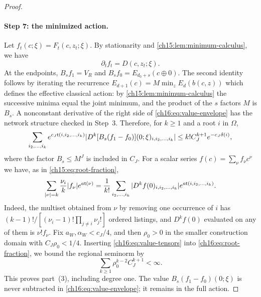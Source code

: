 \begin{proof}
\paragraph{Step 7: the minimized action.}
Let $f_t(c;\xi)=F_t(c,z_t;\xi)$. By stationarity and \cref{ch15:lem:minimum-calculus}, we have
\begin{equation}\label{ch16:eq:value-envelope}
 \partial_tf_t=D(c,z_t;\xi).
\end{equation}
At the endpoints, $B_sf_1=V_R$ and $B_sf_0=E_{d_0+s}(c\oplus0)$. The second identity follows by iterating the recurrence $E_{d+1}(c)=M\min_zE_d(b(c,z))$ which defines the effective classical action: by \cref{ch15:lem:minimum-calculus} the successive minima equal the joint minimum, and the product of the $s$ factors $M$ is $B_s$. A nonconstant derivative of the right side of \eqref{ch16:eq:value-envelope} has the network structure checked in Step~3. Therefore, for $k\ge1$ and a root $i$ in $\Omega$,
\begin{equation}\label{ch16:eq:value-tensors}
 \sum_{i_2,\ldots,i_k}
 e^{c_J\mathsf t(i,i_2,\ldots,i_k)}
 |D^k[B_s(f_1-f_0)](0;\xi)_{i,i_2,\ldots,i_k}|
           \le k!C_J^{k+1}e^{-c_J\delta(i)},
\end{equation}
where the factor $B_s\le M^J$ is included in $C_J$. For a scalar series $f(c)=\sum_\nu f_\nu c^\nu$ we have, as in \eqref{ch15:eq:root-fraction},
\begin{equation}\label{ch16:eq:root-fraction}
 \sum_{|\nu|=k}\frac{\nu_i}{k}|f_\nu|e^{a\mathsf t(\nu)}
 =\frac1{k!}\sum_{i_2,\ldots,i_k}
       |D^kf(0)_{i,i_2,\ldots,i_k}|e^{a\mathsf t(i,i_2,\ldots,i_k)}.
\end{equation}
Indeed, the multiset obtained from $\nu$ by removing one occurrence of $i$ has $(k-1)!/[(\nu_i-1)!\prod_{j\ne i}\nu_j!]$ ordered listings, and $D^kf(0)$ evaluated on any of them is $\nu!f_\nu$. Fix $a_W,\alpha_W<c_J/4$, and then $\rho_0>0$ in the smaller construction domain with $C_J\rho_0<1/4$. Inserting \eqref{ch16:eq:value-tensors} into \eqref{ch16:eq:root-fraction}, we bound the regional seminorm by
\[
 \sum_{k\ge1}\rho_0^{k-2}C_J^{k+1}<\infty.
\]
This proves part~(3), including degree one. The value $B_s(f_1-f_0)(0;\xi)$ is never subtracted in \eqref{ch16:eq:value-envelope}; it remains in the full action.


\end{proof}
